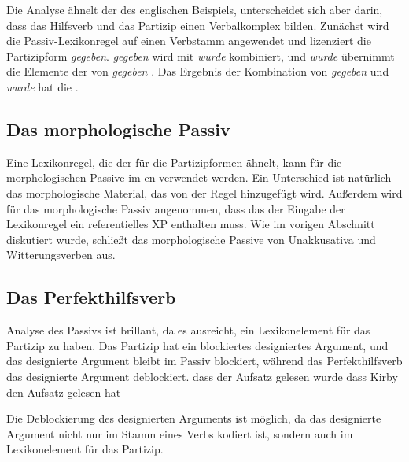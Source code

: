 \noindent
Die Analyse ähnelt der des englischen Beispiels, unterscheidet sich aber darin, dass das Hilfsverb und
das Partizip einen Verbalkomplex bilden. Zunächst wird die Passiv-Lexikonregel auf einen Verbstamm
 angewendet und lizenziert die Partizipform \emph{gegeben}. \emph{gegeben}  wird mit
\emph{wurde} kombiniert, und \emph{wurde} übernimmt die Elemente der \compsl von \emph{gegeben} . Das Ergebnis der Kombination von \emph{gegeben} und \emph{wurde} hat die
\compsl {}.

\subsection{Das morphologische Passiv}

Eine Lexikonregel, die der für die Partizipformen ähnelt, kann für die
morphologischen Passive im en verwendet werden. Ein Unterschied ist natürlich das morphologische Material, das von
der Regel hinzugefügt wird. Außerdem wird für das morphologische Passiv angenommen, dass das \da der Eingabe der Lexikonregel ein
referentielles XP enthalten muss. Wie im vorigen Abschnitt diskutiert wurde, schließt das morphologische Passive von
Unakkusativa und Witterungsverben aus. 



\subsection{Das Perfekthilfsverb}
\label{sec-perfect}

 Analyse des Passivs ist brillant, da es ausreicht, ein Lexikonelement
für das Partizip zu haben. Das Partizip hat ein blockiertes designiertes Argument, und das designierte
Argument bleibt im Passiv blockiert, während das Perfekthilfsverb das designierte
Argument deblockiert. 
\eal
\ex
dass der        Aufsatz gelesen wurde
\ex
dass Kirby den Aufsatz gelesen hat
\zl

\noindent
Die Deblockierung des designierten Arguments ist möglich, da das designierte Argument nicht nur im Stamm eines Verbs
kodiert ist, sondern auch im Lexikonelement für das Partizip.   

